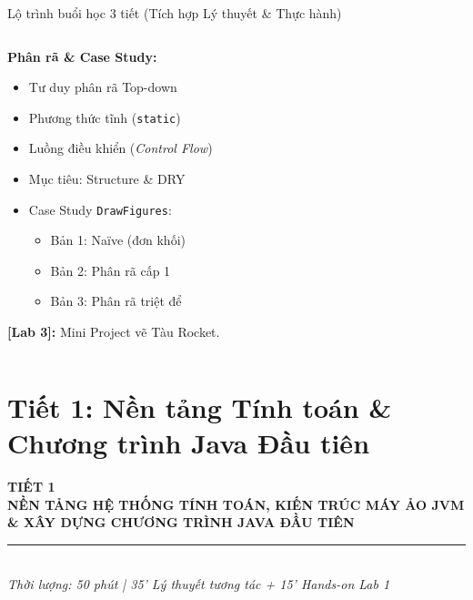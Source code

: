\documentclass[aspectratio=169, 10pt]{beamer}
\begin{document}
\begin{frame}{Lộ trình buổi học 3 tiết (Tích hợp Lý thuyết \& Thực hành)}
\begin{columns}[t]
    \begin{tcolorbox}[colback=UniGreen!10,colframe=UniGreen,title=\textbf{TIẾT 3 (50 phút)},fonttitle=\small\bfseries]
      \footnotesize
      \textbf{Phân rã \& Case Study:}
      \begin{itemize}
        \item Tư duy phân rã Top-down
        \item Phương thức tĩnh (\texttt{static})
        \item Luồng điều khiển (\textit{Control Flow})
        \item Mục tiêu: Structure \& DRY
        \item Case Study \texttt{DrawFigures}:
          \begin{itemize}\scriptsize
            \item Bản 1: Naïve (đơn khối)
            \item Bản 2: Phân rã cấp 1
            \item Bản 3: Phân rã triệt để
          \end{itemize}
      \end{itemize}
      \vspace{1mm}
      \textbf{\textcolor{UniGreen}{[Lab 3]:}} Mini Project vẽ Tàu Rocket.
    \end{tcolorbox}
  \end{columns}
\end{frame}

\section{Tiết 1: Nền tảng Tính toán \& Chương trình Java Đầu tiên}

\begin{frame}[plain]
  \begin{center}
    \vspace{1.5cm}
    {\Huge \textcolor{UniNavy}{\textbf{TIẾT 1}}}\\[4mm]
    {\Large \textbf{NỀN TẢNG HỆ THỐNG TÍNH TOÁN, KIẾN TRÚC MÁY ẢO JVM}}\\[2mm]
    {\large \textbf{\& XÂY DỰNG CHƯƠNG TRÌNH JAVA ĐẦU TIÊN}}\\[6mm]
    \rule{0.5\textwidth}{1pt}\\[4mm]
    \textit{\small Thời lượng: 50 phút | 35' Lý thuyết tương tác + 15' Hands-on Lab 1}
  \end{center}
\end{frame}
\end{document}
